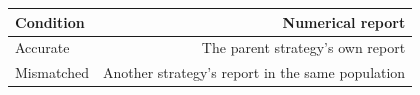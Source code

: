\begin{tabular}{lr}
\toprule
Condition & Numerical report \\
\midrule
Accurate & The parent strategy's own report \\
Mismatched & Another strategy's report in the same population \\
\bottomrule
\end{tabular}
